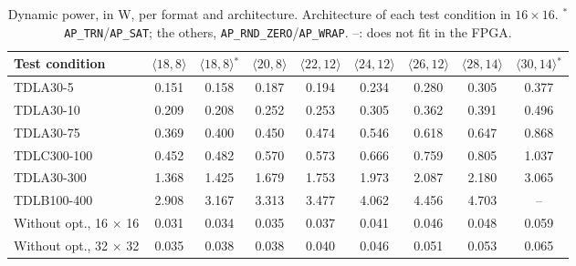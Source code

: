 \begin{table}[htbp]
\caption[Dynamic power, in W, per format and architecture.]{Dynamic power, in W, per format and architecture. Architecture of each test condition in $16 \times 16$. $^{*}$\texttt{AP\_TRN}/\texttt{AP\_SAT}; the others, \texttt{AP\_RND\_ZERO}/\texttt{AP\_WRAP}. --: does not fit in the FPGA.}
\label{tab:potencia-dinamica}
\vspace{4pt}
\centering
\footnotesize
\renewcommand{\arraystretch}{1.2}
\setlength{\tabcolsep}{3pt}
\begin{tabular}{lcccccccc}
\toprule
\textbf{Test condition} & \textbf{$\langle 18,8\rangle$} & \textbf{$\langle 18,8\rangle$$^{*}$} & \textbf{$\langle 20,8\rangle$} & \textbf{$\langle 22,12\rangle$} & \textbf{$\langle 24,12\rangle$} & \textbf{$\langle 26,12\rangle$} & \textbf{$\langle 28,14\rangle$} & \textbf{$\langle 30,14\rangle$$^{*}$} \\
\midrule
TDLA30-5 & 0.151 & 0.158 & 0.187 & 0.194 & 0.234 & 0.280 & 0.305 & 0.377 \\
TDLA30-10 & 0.209 & 0.208 & 0.252 & 0.253 & 0.305 & 0.362 & 0.391 & 0.496 \\
TDLA30-75 & 0.369 & 0.400 & 0.450 & 0.474 & 0.546 & 0.618 & 0.647 & 0.868 \\
TDLC300-100 & 0.452 & 0.482 & 0.570 & 0.573 & 0.666 & 0.759 & 0.805 & 1.037 \\
TDLA30-300 & 1.368 & 1.425 & 1.679 & 1.753 & 1.973 & 2.087 & 2.180 & 3.065 \\
TDLB100-400 & 2.908 & 3.167 & 3.313 & 3.477 & 4.062 & 4.456 & 4.703 & -- \\
\midrule
Without opt., 16 $\times$ 16 & 0.031 & 0.034 & 0.035 & 0.037 & 0.041 & 0.046 & 0.048 & 0.059 \\
Without opt., 32 $\times$ 32 & 0.035 & 0.038 & 0.038 & 0.040 & 0.046 & 0.051 & 0.053 & 0.065 \\
\bottomrule
\end{tabular}
\vspace{4pt}
\end{table}

